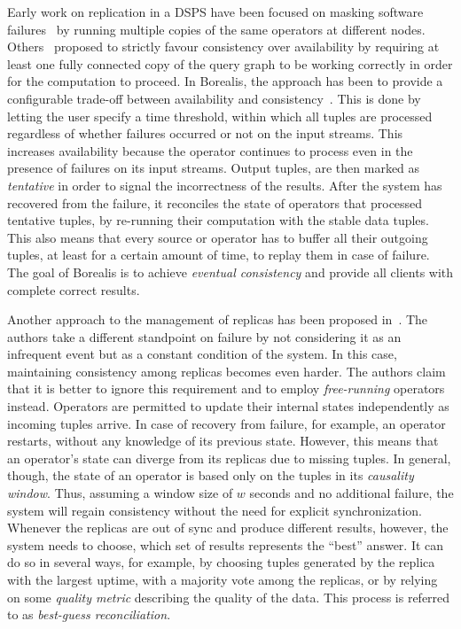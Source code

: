 Early work on replication in a DSPS have been focused on masking software
failures~\cite{borealis_ha_algos} by running multiple copies of the same operators at different nodes.
Others~\cite{ha_ft_dataflows} proposed to strictly favour consistency over availability by
requiring at least one fully connected copy of the query graph to be working correctly in order for the
computation to proceed. %
In Borealis, the approach has been to provide a configurable trade-off between availability and
consistency~\cite{borealis-fault_tolerance}.
This is done by letting the user specify a time threshold, within which all tuples are processed
regardless of whether failures occurred or not on the input streams. This increases availability because
the operator continues to process even in the presence of failures on its input streams. Output tuples,
are then marked as \textit{tentative} in order to signal the incorrectness of the results. After the
system has recovered from the failure, it reconciles the state of operators that processed
tentative tuples, by re-running their computation with the stable data tuples. This also means that every
source or operator has to buffer all their outgoing tuples, at least for a certain amount of time, to
replay them in case of failure. The goal of Borealis is to achieve \textit{eventual consistency} and
provide all clients with complete correct results.

Another approach to the management of replicas has been proposed in~\cite{dependable-is-sensing}. The authors take a
different standpoint on failure by not considering it as an infrequent event but as a constant condition
of the system. In this case, maintaining consistency among replicas becomes even harder. The
authors claim that it is better to ignore this requirement and to employ \textit{free-running} operators
instead.
Operators are permitted to update their internal states independently as incoming tuples arrive. In case
of recovery from failure, for example, an operator restarts, without any knowledge of its
previous state. However, this means that an operator's state can diverge from its replicas due to
missing tuples.
In general, though, the state of an operator is based only on the tuples in its \textit{causality
window}. Thus, assuming a window size of $w$ seconds and no additional failure, the system will regain
consistency without the need for explicit synchronization. Whenever the replicas are out of sync and
produce different results, however, the system needs to choose, which set of results represents the
``best'' answer.
It can do so in several ways, for example, by choosing tuples generated by the replica with the largest
uptime, with a majority vote among the replicas, or by relying on some \textit{quality metric}
describing the quality of the data. This process is referred to as \textit{best-guess reconciliation}.
